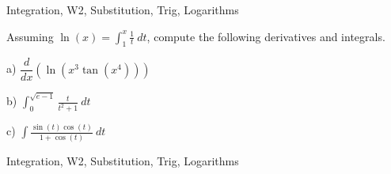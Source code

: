 \begin{tagblock}{Integration, W2, Substitution, Trig, Logarithms}
\begin{question}
	Assuming $\ln(x)=\displaystyle\int^x_1 \frac 1 t \ dt$, compute the following derivatives and integrals.

\bigskip

a) $\dfrac d {dx}(\ln(x^3\tan(x^4)))$ 

\bigskip

b)  $\displaystyle\int_0^{\sqrt{e-1}} \frac t {t^2+1} \ dt$

\bigskip

c) $\displaystyle\int \frac {\sin(t)\cos(t)}{1+\cos(t)} \ dt$
	
	
\begin{tags}
	    Integration, W2, Substitution, Trig, Logarithms
\end{tags}
	
\begin{diary}
	   
\end{diary}
	
\begin{solution}
	   
	    \end{enumerate}
\end{solution}
	
\end{question}

\end{tagblock}


